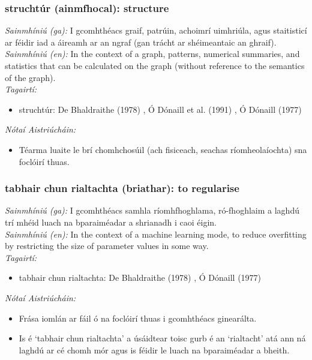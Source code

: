 \subsubsection*{struchtúr (ainmfhocal): structure}
 \noindent \textit{Sainmhíniú (ga):} I gcomhthéacs graif, patrúin, achoimrí uimhriúla, agus staitisticí ar féidir iad a áireamh ar an ngraf (gan trácht ar shéimeantaic an ghraif).
\\
 \noindent \textit{Sainmhíniú (en):} In the context of a graph, patterns, numerical summaries, and statistics that can be calculated on the graph (without reference to the semantics of the graph).
\\
 \noindent \textit{Tagairtí:}
\begin{itemize}
	\item struchtúr: De Bhaldraithe (1978) \cite{de-bhaldraithe}, Ó Dónaill et al. (1991) \cite{focloir-beag}, Ó Dónaill (1977) \cite{odonaill}
\end{itemize}

 \noindent \textit{Nótaí Aistriúcháin:}
\begin{itemize}
	\item Téarma luaite le brí chomhchosúil (ach fisiceach, seachas ríomheolaíochta) sna foclóirí thuas.
\end{itemize}


\subsubsection*{tabhair chun rialtachta (briathar): to regularise}
 \noindent \textit{Sainmhíniú (ga):} I gcomhthéacs samhla ríomhfhoghlama, ró-fhoghlaim a laghdú trí mhéid luach na bparaiméadar a shrianadh i caoi éigin.
\\
 \noindent \textit{Sainmhíniú (en):} In the context of a machine learning mode, to reduce overfitting by restricting the size of parameter values in some way.
\\
 \noindent \textit{Tagairtí:}
\begin{itemize}
	\item tabhair chun rialtachta: De Bhaldraithe (1978) \cite{de-bhaldraithe}, Ó Dónaill (1977) \cite{odonaill}
\end{itemize}

 \noindent \textit{Nótaí Aistriúcháin:}
\begin{itemize}
	\item Frása iomlán ar fáil ó na foclóirí thuas i gcomhthéacs ginearálta.
	\item Is é `tabhair chun rialtachta' a úsáidtear toisc gurb é an `rialtacht' atá ann ná laghdú ar cé chomh mór agus is féidir le luach na bparaiméadar a bheith.
\end{itemize}


